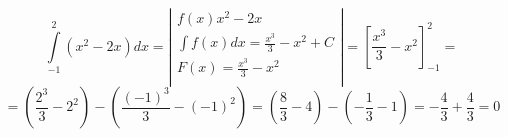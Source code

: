 \documentclass[a4paper,12pt]{article}
\begin{document}
   
	$$
	\int\limits_{-1}^2 (x^2 - 2x)dx =  
	\left|
	\begin{array}{c}
	f(x) x^2 - 2x\\
	\int f(x) dx = \frac{x^3}{3} - x^2 +C\\
	F(x) = \frac{x^3}{3} - x^2 \\
	\end{array}
	\right |
	= 
	\left[
	\frac{x^3}{3}-x^2
	\right ]^{2}_{-1}
	=
	$$
	$$
	= \left(
	\frac{2^3}{3} - 2^2 
	\right )	
	-
	\left(
	\frac{({-1})^3}{3} - ({-1})^2 
	\right )	
	=
	\left(
	\frac{8}{3} - 4 
	\right )
	-
	\left(
	-\frac{1}{3} - 1 
	\right )
	=
	-\frac{4}{3}
	+\frac{4}{3} =0	
	$$
\end{document}
